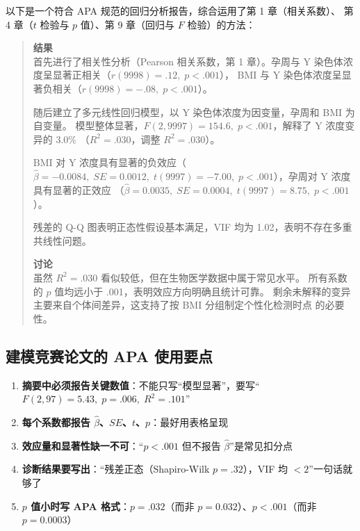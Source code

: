 以下是一个符合 APA 规范的回归分析报告，综合运用了第 1 章（相关系数）、
第 4 章（$t$ 检验与 $p$ 值）、第 9 章（回归与 $F$ 检验）的方法：

\begin{quote}
    \small
    \textbf{结果}\\
    首先进行了相关性分析（Pearson 相关系数，第 1 章）。孕周与 Y 染色体浓度呈显著正相关（$r(9998) = .12,\; p < .001$），
    BMI 与 Y 染色体浓度呈显著负相关（$r(9998) = -.08,\; p < .001$）。
    
    随后建立了多元线性回归模型，以 Y 染色体浓度为因变量，孕周和 BMI 为自变量。
    模型整体显著，$F(2, 9997) = 154.6,\; p < .001$，解释了 Y 浓度变异的 3.0\%
    （$R^2 = .030$，调整 $R^2 = .030$）。
    
    BMI 对 Y 浓度具有显著的负效应（$\hat{\beta} = -0.0084,\; SE = 0.0012,\;
    t(9997) = -7.00,\; p < .001$），孕周对 Y 浓度具有显著的正效应
    （$\hat{\beta} = 0.0035,\; SE = 0.0004,\; t(9997) = 8.75,\; p < .001$）。
    
    残差的 Q-Q 图表明正态性假设基本满足，VIF 均为 1.02，表明不存在多重共线性问题。
    
    \textbf{讨论}\\
    虽然 $R^2 = .030$ 看似较低，但在生物医学数据中属于常见水平。
    所有系数的 $p$ 值均远小于 .001，表明效应方向明确且统计可靠。
    剩余未解释的变异主要来自个体间差异，这支持了按 BMI 分组制定个性化检测时点
    的必要性。
\end{quote}

\subsection{建模竞赛论文的 APA 使用要点}

\begin{enumerate}[label=(\arabic*)]
    \item \textbf{摘要中必须报告关键数值}：不能只写“模型显著”，要写“$F(2,97)=5.43,\;p=.006,\;R^2=.101$”
    \item \textbf{每个系数都报告 $\hat{\beta}$、$SE$、$t$、$p$}：最好用表格呈现
    \item \textbf{效应量和显著性缺一不可}：“$p<.001$ 但不报告 $\hat{\beta}$”是常见扣分点
    \item \textbf{诊断结果要写出}：“残差正态（Shapiro-Wilk $p=.32$），VIF 均 $<2$”一句话就够了
    \item \textbf{$p$ 值小时写 APA 格式}：$p = .032$（而非 $p = 0.032$）、$p < .001$（而非 $p = 0.0003$）
\end{enumerate}

